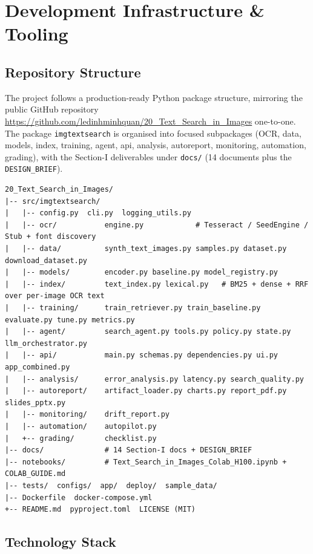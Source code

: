 \documentclass[12pt,a4paper]{article}
\begin{document}
\section{Development Infrastructure \& Tooling}

\subsection{Repository Structure}

The project follows a production-ready Python package structure, mirroring the public GitHub repository \url{https://github.com/ledinhminhquan/20_Text_Search_in_Images} one-to-one. The package \texttt{imgtextsearch} is organised into focused subpackages (OCR, data, models, index, training, agent, api, analysis, autoreport, monitoring, automation, grading), with the Section-I deliverables under \texttt{docs/} (14 documents plus the \texttt{DESIGN\_BRIEF}).

\begin{lstlisting}[basicstyle=\ttfamily\footnotesize]
20_Text_Search_in_Images/
|-- src/imgtextsearch/
|   |-- config.py  cli.py  logging_utils.py
|   |-- ocr/           engine.py            # Tesseract / SeedEngine / Stub + font discovery
|   |-- data/          synth_text_images.py samples.py dataset.py download_dataset.py
|   |-- models/        encoder.py baseline.py model_registry.py
|   |-- index/         text_index.py lexical.py   # BM25 + dense + RRF over per-image OCR text
|   |-- training/      train_retriever.py train_baseline.py evaluate.py tune.py metrics.py
|   |-- agent/         search_agent.py tools.py policy.py state.py llm_orchestrator.py
|   |-- api/           main.py schemas.py dependencies.py ui.py app_combined.py
|   |-- analysis/      error_analysis.py latency.py search_quality.py
|   |-- autoreport/    artifact_loader.py charts.py report_pdf.py slides_pptx.py
|   |-- monitoring/    drift_report.py
|   |-- automation/    autopilot.py
|   +-- grading/       checklist.py
|-- docs/              # 14 Section-I docs + DESIGN_BRIEF
|-- notebooks/         # Text_Search_in_Images_Colab_H100.ipynb + COLAB_GUIDE.md
|-- tests/  configs/  app/  deploy/  sample_data/
|-- Dockerfile  docker-compose.yml
+-- README.md  pyproject.toml  LICENSE (MIT)
\end{lstlisting}

\subsection{Technology Stack}
\end{document}
